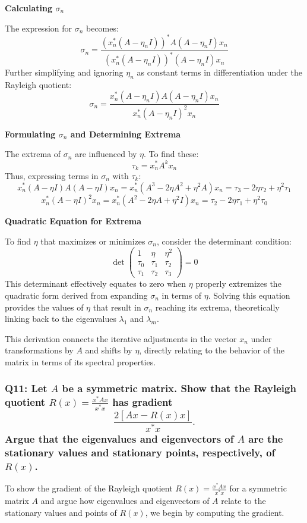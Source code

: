 \documentclass[8pt]{article}
\begin{document}
{{\textbf{Calculating \(\sigma_n\)}

The expression for \(\sigma_n\) becomes:
\[
\sigma_n = \frac{(x_n^* (A - \eta_n I))^* A (A - \eta_n I) x_n}{(x_n^* (A - \eta_n I))^* (A - \eta_n I) x_n}
\]
Further simplifying and ignoring \(\eta_n\) as constant terms in differentiation under the Rayleigh quotient:
\[
\sigma_n = \frac{x_n^* (A - \eta_n I) A (A - \eta_n I) x_n}{x_n^* (A - \eta_n I)^2 x_n}
\]

\textbf{Formulating \(\sigma_n\) and Determining Extrema}

The extrema of \(\sigma_n\) are influenced by \(\eta\). To find these:
\[
\tau_k = x_n^* A^k x_n
\]
Thus, expressing terms in \(\sigma_n\) with \(\tau_k\):
\[
x_n^* (A - \eta I) A (A - \eta I) x_n = x_n^* (A^3 - 2\eta A^2 + \eta^2 A) x_n = \tau_3 - 2\eta \tau_2 + \eta^2 \tau_1
\]
\[
x_n^* (A - \eta I)^2 x_n = x_n^* (A^2 - 2\eta A + \eta^2 I) x_n = \tau_2 - 2\eta \tau_1 + \eta^2 \tau_0
\]

\textbf{Quadratic Equation for Extrema}

To find \(\eta\) that maximizes or minimizes \(\sigma_n\), consider the determinant condition:
\[
\det \begin{pmatrix}
1 & \eta & \eta^2 \\
\tau_0 & \tau_1 & \tau_2 \\
\tau_1 & \tau_2 & \tau_3
\end{pmatrix} = 0
\]
This determinant effectively equates to zero when \(\eta\) properly extremizes the quadratic form derived from expanding \(\sigma_n\) in terms of \(\eta\). Solving this equation provides the values of \(\eta\) that result in \(\sigma_n\) reaching its extrema, theoretically linking back to the eigenvalues \(\lambda_1\) and \(\lambda_m\).

This derivation connects the iterative adjustments in the vector \(x_n\) under transformations by \(A\) and shifts by \(\eta\), directly relating to the behavior of the matrix in terms of its spectral properties.

\subsubsection*{Q11: Let \(A\) be a symmetric matrix. Show that the Rayleigh quotient \(R(x) = \frac{x^* A x}{x^* x}\) has gradient
\[
\frac{2[Ax - R(x)x]}{x^* x}.
\]
Argue that the eigenvalues and eigenvectors of \(A\) are the stationary values and stationary points, respectively, of \(R(x)\).}

To show the gradient of the Rayleigh quotient \( R(x) = \frac{x^* A x}{x^* x} \) for a symmetric matrix \(A\) and argue how eigenvalues and eigenvectors of \(A\) relate to the stationary values and points of \(R(x)\), we begin by computing the gradient.

}}
\end{document}
